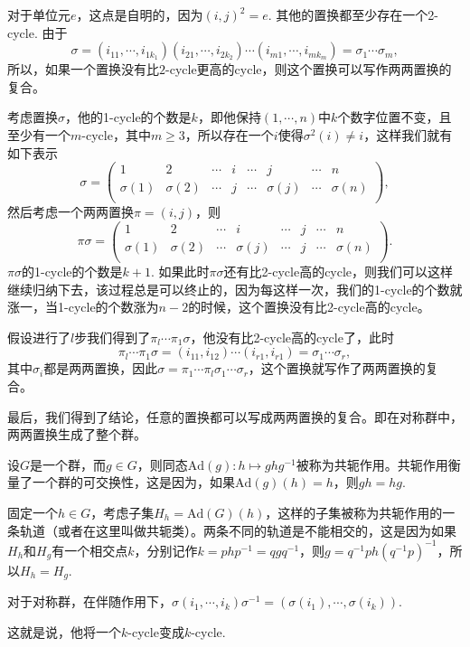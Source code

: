 \documentclass[11pt]{article}
\theoremstyle{definition}
\theoremstyle{plain}
\begin{document}
\proof 对于单位元$e$，这点是自明的，因为$(i,j)^2=e$. 其他的置换都至少存在一个2-cycle. 由于
\[
	\sigma=(i_{11},\cdots,i_{1k_1})(i_{21},\cdots,i_{2k_2})\cdots (i_{m1},\cdots,i_{mk_m})=\sigma_1 \cdots \sigma_m,
\]
所以，如果一个置换没有比$2$-cycle更高的cycle，则这个置换可以写作两两置换的复合。

考虑置换$\sigma$，他的1-cycle的个数是$k$，即他保持$(1,\cdots,n)$中$k$个数字位置不变，且至少有一个$m$-cycle，其中$m\geq 3$，所以存在一个$i$使得$\sigma^2(i)\neq i$，这样我们就有如下表示
\[
	\sigma=\begin{pmatrix}
	1&2&\cdots&i&\cdots &j&\cdots&n\\
	\sigma(1)&\sigma(2)&\cdots&j&\cdots &\sigma(j)&\cdots&\sigma(n)\\
	\end{pmatrix},
\]
然后考虑一个两两置换$\pi=(i,j)$，则
\[
	\pi\sigma=\begin{pmatrix}
	1&2&\cdots&i&\cdots &j&\cdots&n\\
	\sigma(1)&\sigma(2)&\cdots&\sigma(j)&\cdots &j&\cdots&\sigma(n)\\
	\end{pmatrix}.
\]
$\pi\sigma$的1-cycle的个数是$k+1$. 如果此时$\pi\sigma$还有比2-cycle高的cycle，则我们可以这样继续归纳下去，该过程总是可以终止的，因为每这样一次，我们的1-cycle的个数就涨一，当1-cycle的个数涨为$n-2$的时候，这个置换没有比2-cycle高的cycle。

假设进行了$l$步我们得到了$\pi_l\cdots\pi_1 \sigma$，他没有比2-cycle高的cycle了，此时
\[
\pi_l\cdots\pi_1 \sigma=(i_{11},i_{12}) \cdots  (i_{r1},i_{r1})=\sigma_1 \cdots  \sigma_r,
\]
其中$\sigma_i$都是两两置换，因此$\sigma=\pi_1\cdots\pi_l\sigma_1\cdots \sigma_r$，这个置换就写作了两两置换的复合。

最后，我们得到了结论，任意的置换都可以写成两两置换的复合。即在对称群中，两两置换生成了整个群。\endproof

\para 设$G$是一个群，而$g\in G$，则同态$\mathrm{Ad}(g):h\mapsto ghg^{-1}$被称为共轭作用。共轭作用衡量了一个群的可交换性，这是因为，如果$\mathrm{Ad}(g)(h)=h$，则$gh=hg$.

固定一个$h\in G$，考虑子集$H_h=\mathrm{Ad}(G)(h)$，这样的子集被称为共轭作用的一条轨道（或者在这里叫做共轭类）。两条不同的轨道是不能相交的，这是因为如果$H_h$和$H_g$有一个相交点$k$，分别记作$k=php^{-1}=qgq^{-1}$，则$g=q^{-1}ph(q^{-1}p)^{-1}$，所以$H_h=H_g$.

{\pro 对于对称群，在伴随作用下，$\sigma (i_1,\cdots,i_k)\sigma^{-1}= (\sigma(i_1),\cdots,\sigma(i_k))$. \endpro}

这就是说，他将一个$k$-cycle变成$k$-cycle.
\end{document}
